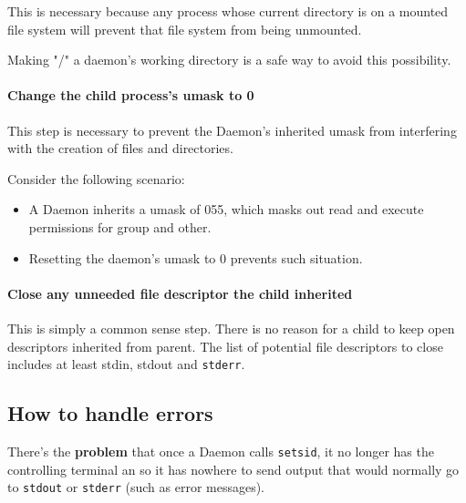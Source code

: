 This is necessary because any process whose current directory is on a mounted file system will prevent that file system from being unmounted.

Making "/" a daemon's working directory is a safe way to avoid this possibility.
%

%

\paragraph{\textbf{Change the child process's umask to 0}}

This step is necessary to prevent the Daemon's inherited umask from interfering with the creation of files and directories.

Consider the following scenario:
\begin{itemize}
\item A Daemon inherits a umask of 055, which masks out read and execute permissions for group and other. 
\item Resetting the daemon’s umask to 0 prevents such situation.
\end{itemize}
%

%

\paragraph{\textbf{Close any unneeded file descriptor the child inherited}}

This is simply a common sense step. There is no reason for a child to keep open descriptors inherited from parent.
The list of potential file descriptors to close includes at least stdin, stdout and \texttt{stderr}.
%

%

\subsection{How to handle errors}

There's the \textbf{problem} that once a Daemon calls \texttt{setsid}, it no longer has the controlling terminal an so it has nowhere to send output that would normally go to \texttt{stdout} or \texttt{stderr} (such as error messages).

